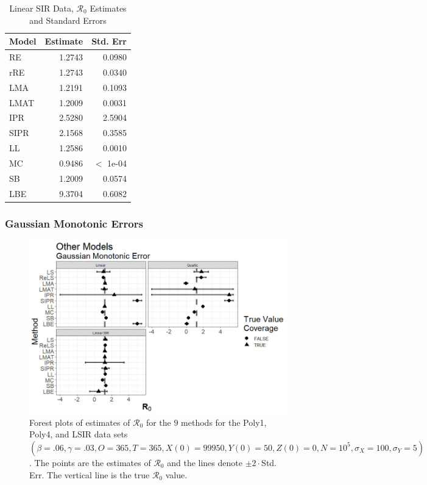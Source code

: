 \documentclass[12pt]{article}
\newcommand{\xxsir}{\ensuremath{9} } %
\newcommand{\rr}{\ensuremath{\mathcal{R}_0}}
\begin{document}
\begin{table}[H]
	
	\centering
	\begin{tabular}[t]{l|r|r}
		\hline
		Model & Estimate & Std. Err\\
		\hline
		RE & 1.2743 & 0.0980\\
		\hline
		rRE & 1.2743 & 0.0340\\
		\hline
		LMA & 1.2191 & 0.1093\\
		\hline
		LMAT & 1.2009 & 0.0031\\
		\hline
		IPR & 2.5280 & 2.5904\\
		\hline
		SIPR & 2.1568 & 0.3585\\
		\hline
		LL & 1.2586 & 0.0010\\
		\hline
		MC & 0.9486 & $<$ 1e-04 \\
		\hline
		SB & 1.2009 & 0.0574\\
		\hline
		LBE & 9.3704 & 0.6082\\
		\hline
	\end{tabular}
	\caption{Linear SIR Data, $\rr$ Estimates and Standard Errors}\label{tab:other-res3}
\end{table}

\subsubsection{Gaussian Monotonic Errors}

\begin{figure}[H]
	\begin{center}
		\includegraphics[scale=0.5]{images/other_nm.jpg}
		\caption{Forest plots of estimates of $\rr$ for the \xxsir methods for the Poly1, Poly4, and LSIR data sets $(\beta=.06, \gamma=.03, O=365, T=365, X(0)=99950, Y(0)=50, Z(0)=0, N=10^5, \sigma_X=100, \sigma_Y=5)$.  The points are the estimates of $\rr$ and the lines denote $\pm 2\cdot $Std. Err.  The vertical line is the true $\rr$ value.}
	\end{center}
\end{figure}
\end{document}
